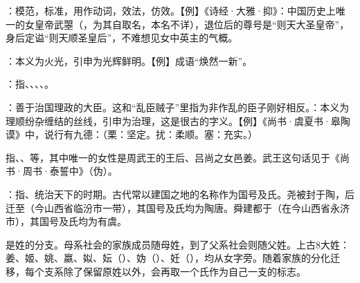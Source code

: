 {
\item {}：模范，标准，用作动词，效法，仿效。【例】《诗经·大雅·抑》：中国历史上唯一的女皇帝武曌（，为其自取名，本名不详），退位后的尊号是“则天大圣皇帝”，身后定谥“则天顺圣皇后”，不难想见女中英主的气概。
\item {}：本义为火光，引申为光辉鲜明。【例】成语“焕然一新”。
}
{}


{
\item {}：指、、、、。
\item {}：善于治国理政的大臣。这和“乱臣贼子”里指为非作乱的臣子刚好相反。：本义为理顺纷杂缠结的丝线，引申为治理，这是很古的字义。【例】《尚书·虞夏书·皋陶谟》中，说行有九德：（栗：坚定。扰：柔顺。塞：充实。）

指、、等，其中唯一的女性是周武王的王后、吕尚之女邑姜。武王这句话见于《尚书·周书·泰誓中》（伪）。

\item {}：指、统治天下的时期。古代常以建国之地的名称作为国号及氏。尧被封于陶，后迁至（今山西省临汾市一带），其国号及氏均为陶唐。舜建都于（在今山西省永济市），其国号及氏均为有虞。%

是姓的分支。母系社会的家族成员随母姓，到了父系社会则随父姓。上古8大姓：姜、姬、姚、嬴、姒、妘（）、妫（）、妊（），均从女字旁。随着家族的分化迁移，每个支系除了保留原姓以外，会再取一个氏作为自己一支的标志。

}
